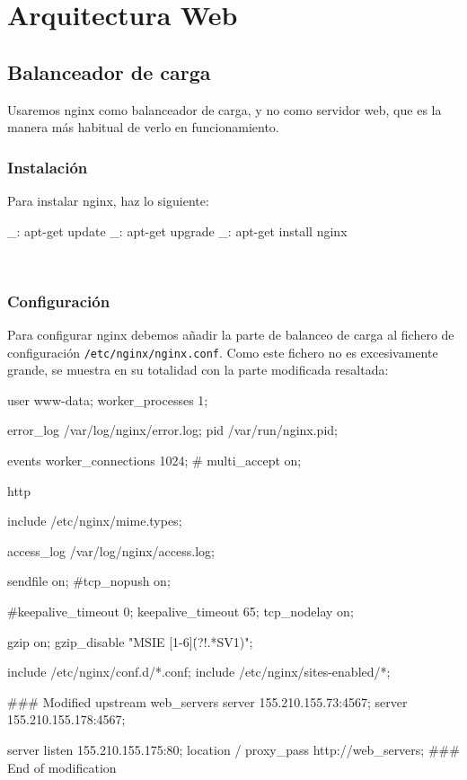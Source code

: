 \chapter{Arquitectura Web}
\label{anx:web}


\section{Balanceador de carga}


Usaremos nginx como balanceador de carga, y no como servidor web, que es la manera más habitual de verlo en funcionamiento.


\subsection{Instalación}

Para instalar nginx, haz lo siguiente:

\begin{bashcode}
_: apt-get update
_: apt-get upgrade
_: apt-get install nginx
\end{bashcode}
\\


\subsection{Configuración}

Para configurar nginx debemos añadir la parte de balanceo de carga al fichero de configuración \texttt{/etc/nginx/nginx.conf}. Como este fichero no es excesivamente grande, se muestra en su totalidad con la parte modificada resaltada:

\begin{bashcode}
user www-data;
worker_processes  1;

error_log  /var/log/nginx/error.log;
pid        /var/run/nginx.pid;

events {
    worker_connections  1024;
    # multi_accept on;
}

http {
    include       /etc/nginx/mime.types;

    access_log	/var/log/nginx/access.log;

    sendfile        on;
    #tcp_nopush     on;

    #keepalive_timeout  0;
    keepalive_timeout  65;
    tcp_nodelay        on;

    gzip  on;
    gzip_disable "MSIE [1-6]\.(?!.*SV1)";

    include /etc/nginx/conf.d/*.conf;
    include /etc/nginx/sites-enabled/*;


    ### Modified
    upstream web_servers {
      server 155.210.155.73:4567;
      server 155.210.155.178:4567;
    }

    server {
      listen 155.210.155.175:80;
      location / {
        proxy_pass http://web_servers;
      }
    }
    ### End of modification


}
\end{bashcode}
\\



